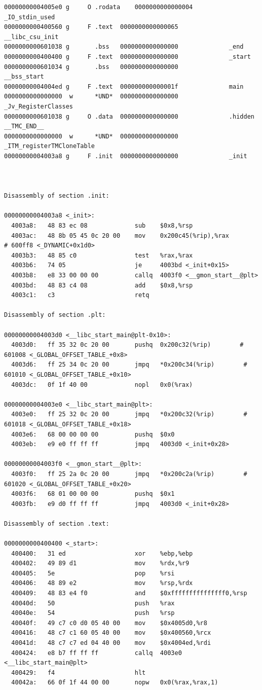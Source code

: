 \documentclass[11pt]{article}
\begin{document}
\begin{enumerate}
\begin{verbatim}
00000000004005e0 g     O .rodata	0000000000000004              _IO_stdin_used
0000000000400560 g     F .text	0000000000000065              __libc_csu_init
0000000000601038 g       .bss	0000000000000000              _end
0000000000400400 g     F .text	0000000000000000              _start
0000000000601034 g       .bss	0000000000000000              __bss_start
00000000004004ed g     F .text	000000000000001f              main
0000000000000000  w      *UND*	0000000000000000              _Jv_RegisterClasses
0000000000601038 g     O .data	0000000000000000              .hidden __TMC_END__
0000000000000000  w      *UND*	0000000000000000              _ITM_registerTMCloneTable
00000000004003a8 g     F .init	0000000000000000              _init



Disassembly of section .init:

00000000004003a8 <_init>:
  4003a8:	48 83 ec 08          	sub    $0x8,%rsp
  4003ac:	48 8b 05 45 0c 20 00 	mov    0x200c45(%rip),%rax        # 600ff8 <_DYNAMIC+0x1d0>
  4003b3:	48 85 c0             	test   %rax,%rax
  4003b6:	74 05                	je     4003bd <_init+0x15>
  4003b8:	e8 33 00 00 00       	callq  4003f0 <__gmon_start__@plt>
  4003bd:	48 83 c4 08          	add    $0x8,%rsp
  4003c1:	c3                   	retq   

Disassembly of section .plt:

00000000004003d0 <__libc_start_main@plt-0x10>:
  4003d0:	ff 35 32 0c 20 00    	pushq  0x200c32(%rip)        # 601008 <_GLOBAL_OFFSET_TABLE_+0x8>
  4003d6:	ff 25 34 0c 20 00    	jmpq   *0x200c34(%rip)        # 601010 <_GLOBAL_OFFSET_TABLE_+0x10>
  4003dc:	0f 1f 40 00          	nopl   0x0(%rax)

00000000004003e0 <__libc_start_main@plt>:
  4003e0:	ff 25 32 0c 20 00    	jmpq   *0x200c32(%rip)        # 601018 <_GLOBAL_OFFSET_TABLE_+0x18>
  4003e6:	68 00 00 00 00       	pushq  $0x0
  4003eb:	e9 e0 ff ff ff       	jmpq   4003d0 <_init+0x28>

00000000004003f0 <__gmon_start__@plt>:
  4003f0:	ff 25 2a 0c 20 00    	jmpq   *0x200c2a(%rip)        # 601020 <_GLOBAL_OFFSET_TABLE_+0x20>
  4003f6:	68 01 00 00 00       	pushq  $0x1
  4003fb:	e9 d0 ff ff ff       	jmpq   4003d0 <_init+0x28>

Disassembly of section .text:

0000000000400400 <_start>:
  400400:	31 ed                	xor    %ebp,%ebp
  400402:	49 89 d1             	mov    %rdx,%r9
  400405:	5e                   	pop    %rsi
  400406:	48 89 e2             	mov    %rsp,%rdx
  400409:	48 83 e4 f0          	and    $0xfffffffffffffff0,%rsp
  40040d:	50                   	push   %rax
  40040e:	54                   	push   %rsp
  40040f:	49 c7 c0 d0 05 40 00 	mov    $0x4005d0,%r8
  400416:	48 c7 c1 60 05 40 00 	mov    $0x400560,%rcx
  40041d:	48 c7 c7 ed 04 40 00 	mov    $0x4004ed,%rdi
  400424:	e8 b7 ff ff ff       	callq  4003e0 <__libc_start_main@plt>
  400429:	f4                   	hlt    
  40042a:	66 0f 1f 44 00 00    	nopw   0x0(%rax,%rax,1)


\end{verbatim}
\end{enumerate}
\end{document}
